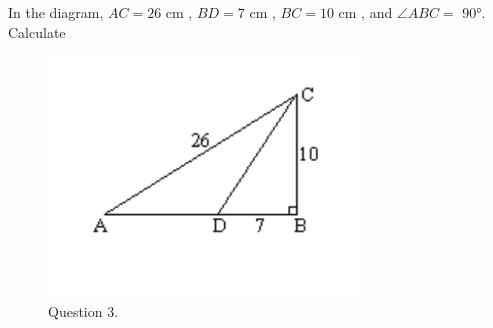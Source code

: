 \documentclass[12pt,answers]{exam}
\newcommand{\cm}{\si{\centi\metre} }
\begin{document}
\begin{questions}
\question In the diagram, \(AC = 26\) \cm, \(BD = 7\) \cm, \(BC = 10\) \cm,
and \(\angle ABC =\) \ang{90}. Calculate
\begin{figure}
	\centering
	\includegraphics{tri2.png}
	\caption{Question 3.}
	\label{fig:trings}
\end{figure}


\end{questions}
\end{document}
